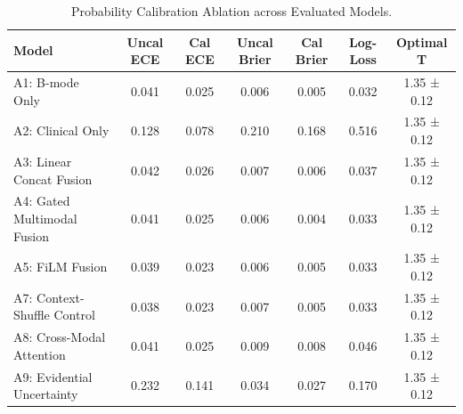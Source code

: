 \begin{table}[h]
\centering
\caption{Probability Calibration Ablation across Evaluated Models.}
\label{tab:calibration_ablation}
\begin{tabular}{lcccccc}
\hline
\textbf{Model} & \textbf{Uncal ECE} & \textbf{Cal ECE} & \textbf{Uncal Brier} & \textbf{Cal Brier} & \textbf{Log-Loss} & \textbf{Optimal T} \\
\hline
A1: B-mode Only & 0.041 & 0.025 & 0.006 & 0.005 & 0.032 & 1.35 ± 0.12 \\
A2: Clinical Only & 0.128 & 0.078 & 0.210 & 0.168 & 0.516 & 1.35 ± 0.12 \\
A3: Linear Concat Fusion & 0.042 & 0.026 & 0.007 & 0.006 & 0.037 & 1.35 ± 0.12 \\
A4: Gated Multimodal Fusion & 0.041 & 0.025 & 0.006 & 0.004 & 0.033 & 1.35 ± 0.12 \\
A5: FiLM Fusion & 0.039 & 0.023 & 0.006 & 0.005 & 0.033 & 1.35 ± 0.12 \\
A7: Context-Shuffle Control & 0.038 & 0.023 & 0.007 & 0.005 & 0.033 & 1.35 ± 0.12 \\
A8: Cross-Modal Attention & 0.041 & 0.025 & 0.009 & 0.008 & 0.046 & 1.35 ± 0.12 \\
A9: Evidential Uncertainty & 0.232 & 0.141 & 0.034 & 0.027 & 0.170 & 1.35 ± 0.12 \\
\hline
\end{tabular}
\end{table}
